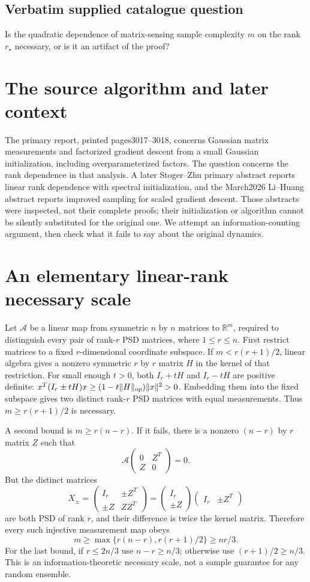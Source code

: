 \documentclass[11pt]{article}
\begin{document}
\subsection{Verbatim supplied catalogue question}
Is the quadratic dependence of matrix-sensing sample complexity $m$ on the rank $r_\star$ necessary, or is it an artifact of the proof?

\section{The source algorithm and later context}
The primary report, printed pages3017--3018, concerns Gaussian
matrix measurements and factorized gradient descent from a small
Gaussian initialization, including overparameterized factors.
The question concerns the rank dependence in that analysis.
A later Stoger--Zhu primary abstract reports linear rank dependence
with spectral initialization, and the March2026 Li--Huang abstract
reports improved sampling for scaled gradient descent. Those
abstracts were inspected, not their complete proofs; their
initialization or algorithm cannot be silently substituted for
the original one. We attempt an information-counting argument,
then check what it fails to say about the original dynamics.

\section{An elementary linear-rank necessary scale}
Let $\mathcal A$ be a linear map from symmetric $n$ by $n$
matrices to $\mathbb R^m$, required to distinguish every pair of
rank-$r$ PSD matrices, where $1\le r\le n$. First restrict
matrices to a fixed $r$-dimensional coordinate subspace. If
$m<r(r+1)/2$, linear algebra gives a nonzero symmetric $r$ by
$r$ matrix $H$ in the kernel of that restriction. For small
enough $t>0$, both $I_r+tH$ and $I_r-tH$ are positive definite:
$x^T(I_r\pm tH)x\ge(1-t\|H\|_{\rm op})\|x\|^2>0$.
Embedding them into the fixed subspace gives two distinct
rank-$r$ PSD matrices with equal measurements. Thus
$m\ge r(r+1)/2$ is necessary.

A second bound is $m\ge r(n-r)$. If it fails, there is a
nonzero $(n-r)$ by $r$ matrix $Z$ such that
\[
 \mathcal A\begin{pmatrix}0&Z^T\\Z&0\end{pmatrix}=0.
\]
But the distinct matrices
\[
 X_\pm=\begin{pmatrix}I_r&\pm Z^T\\\pm Z&ZZ^T\end{pmatrix}
 =\begin{pmatrix}I_r\\\pm Z\end{pmatrix}
  \begin{pmatrix}I_r&\pm Z^T\end{pmatrix}
\]
are both PSD of rank $r$, and their difference is twice the
kernel matrix. Therefore every such injective measurement map
obeys
\[
 m\ge\max\{r(n-r),r(r+1)/2\}\ge nr/3.
\]
For the last bound, if $r\le2n/3$ use $n-r\ge n/3$;
otherwise use $(r+1)/2\ge n/3$. This is an information-theoretic
necessary scale, not a sample guarantee for any random ensemble.
\end{document}

